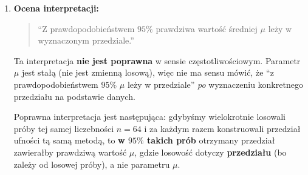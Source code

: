 \documentclass[polish, 10pt]{extarticle}
\begin{document}
\begin{enumerate}
\begin{itemize}
\smallskip
\textbf{Krok 2: podstawienie definicji $T$ i rozwiązanie nierówności względem $\mu$.}
Z kroku 2 mamy:
\[
\mathbb{P}\!\left(
-t_{0.975,\;n-1}
\le
\frac{\bar{X}-\mu}{S/\sqrt{n}}
\le
t_{0.975,\;n-1}
\right)=0{,}95.
\]
Mnożymy nierówność przez dodatnią liczbę $S/\sqrt{n}$ (nie zmienia znaku nierówności):
\[
\mathbb{P}\!\left(
-t_{0.975,\;n-1}\frac{S}{\sqrt{n}}
\le
\bar{X}-\mu
\le
t_{0.975,\;n-1}\frac{S}{\sqrt{n}}
\right)=0{,}95.
\]
Teraz przekształcamy tak, aby w środku był parametr $\mu$. 
\[
\mathbb{P}\!\left(
\bar{X}- t_{0.975,\;n-1}\frac{S}{\sqrt{n}}
\le
\mu
\le
\bar{X}+ t_{0.975,\;n-1}\frac{S}{\sqrt{n}}
\right)=0{,}95.
\]
Z definicji oznacza to, że
\[
\boxed{
CI_{0.95}(\mu)=
\left(
\bar{X}- t_{0.975,\;n-1}\frac{S}{\sqrt{n}},
\;
\bar{X}+ t_{0.975,\;n-1}\frac{S}{\sqrt{n}}
\right)
}
\]
jest $95\%$ przedziałem ufności dla $\mu$.

\underline{Uwaga:} Przy dużym $n$ (tu: $n=64$) można też spotkać wersję aproksymacyjną z rozkładem normalnym:
$t_{0.975,\;n-1} \approx z_{0.975}$, co daje bardzo zbliżony przedział.

\end{itemize}


\item \textbf{Ocena interpretacji:}
\begin{quote}
``Z prawdopodobieństwem $95\%$ prawdziwa wartość średniej $\mu$ leży w wyznaczonym przedziale.''
\end{quote}

Ta interpretacja \textbf{nie jest poprawna} w sensie częstotliwościowym. Parametr $\mu$ jest stałą (nie jest zmienną losową), więc nie ma sensu mówić, że ``z prawdopodobieństwem $95\%$ $\mu$ leży w przedziale'' \emph{po} wyznaczeniu konkretnego przedziału na podstawie danych.

Poprawna interpretacja jest następująca:
gdybyśmy wielokrotnie losowali próby tej samej liczebności $n=64$ i za każdym razem konstruowali przedział ufności tą samą metodą, to \textbf{w $95\%$ takich prób} otrzymany przedział zawierałby prawdziwą wartość $\mu$, gdzie losowość dotyczy \textbf{przedziału} (bo zależy od losowej próby), a nie parametru $\mu$.

\end{enumerate}
\end{document}
